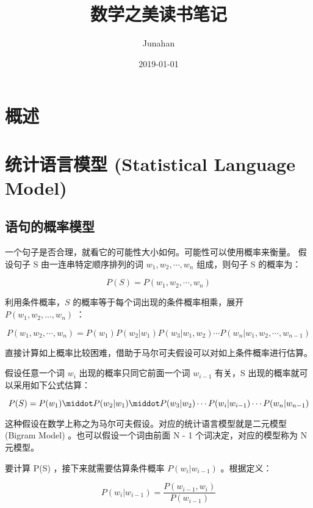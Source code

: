 \documentclass[11pt]{article}
\author{Junahan}
\date{2019-01-01}
\title{数学之美读书笔记}
\begin{document}
\maketitle

\section{概述}
\label{sec:org6642498}

\section{统计语言模型 (Statistical Language Model)}
\label{sec:org730328b}

\subsection{语句的概率模型}
\label{sec:org7b25c3c}
一个句子是否合理，就看它的可能性大小如何。可能性可以使用概率来衡量。
假设句子 S 由一连串特定顺序排列的词 \(w_1,w_2,\cdots,w_n\) 组成，则句子 S 的概率为：

\begin{equation}
P(S)=P(w_1,w_2,\cdots,w_n)
\end{equation}

利用条件概率，\(S\) 的概率等于每个词出现的条件概率相乘，展开 \(P(w_1,w_2,...,w_n)\) ：

\begin{equation}
P(w_1,w_2,\cdots,w_n) 
= P(w_1)P(w_2|w_1)P(w_3|w_1,w_2) \cdots P(w_n|w_1,w_2,\cdots,w_{n-1})
\end{equation}

直接计算如上概率比较困难，借助于马尔可夫假设可以对如上条件概率进行估算。

假设任意一个词 \(w_i\) 出现的概率只同它前面一个词 \(w_{i-1}\) 有关，S 出现的概率就可以采用如下公式估算：

\begin{equation}
P(S)=P(w_1) \middot P(w_2|w_1) \middot P(w_3|w_2) \cdots P(w_i|w_{i-1}) \cdots P(w_n|w_{n-1})
\end{equation}

这种假设在数学上称之为马尔可夫假设。对应的统计语言模型就是二元模型 (Bigram Model) 。也可以假设一个词由前面 N - 1 个词决定，对应的模型称为 N 元模型。

要计算 P(S) ，接下来就需要估算条件概率 \(P(w_{i}|w_{i-1})\) 。根据定义：

\begin{equation}
P(w_{i}|w_{i-1}) = \frac{P(w_{i-1},w_{i})}{P(w_{i-1})}
\end{equation}
\end{document}
